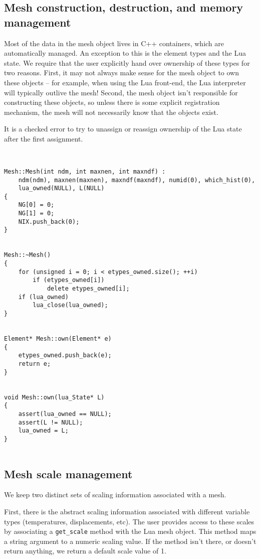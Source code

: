 \subsection{Mesh construction, destruction, and memory management}

Most of the data in the mesh object lives in C++ containers, which
are automatically managed.  An exception to this is the element types
and the Lua state.  We require that the user explicitly hand over
ownership of these types for two reasons.  First, it may not always
make sense for the mesh object to own these objects -- for example,
when using the Lua front-end, the Lua interpreter will typically outlive
the mesh!  Second, the mesh object isn't responsible for constructing
these objects, so unless there is some explicit registration mechanism,
the mesh will not necessarily know that the objects exist.

It is a checked error to try to unassign or reassign ownership of
the Lua state after the first assignment.

\begin{verbatim}


Mesh::Mesh(int ndm, int maxnen, int maxndf) :
    ndm(ndm), maxnen(maxnen), maxndf(maxndf), numid(0), which_hist(0),
    lua_owned(NULL), L(NULL)
{
    NG[0] = 0;
    NG[1] = 0;
    NIX.push_back(0);
}


Mesh::~Mesh()
{
    for (unsigned i = 0; i < etypes_owned.size(); ++i)
        if (etypes_owned[i])
            delete etypes_owned[i];
    if (lua_owned)
        lua_close(lua_owned);
}


Element* Mesh::own(Element* e)
{
    etypes_owned.push_back(e);
    return e;
}


void Mesh::own(lua_State* L)
{
    assert(lua_owned == NULL);
    assert(L != NULL);
    lua_owned = L;
}


\end{verbatim}
\subsection{Mesh scale management}

We keep two distinct sets of scaling information associated with a
mesh.  

First, there is the abstract scaling information associated with
different variable types (temperatures, displacements, etc).  The
user provides access to these scales by associating a
{\tt get\_scale} method with the Lua mesh object.  This method maps
a string argument to a numeric scaling value.  If the method isn't
there, or doesn't return anything, we return a default scale value
of 1.


